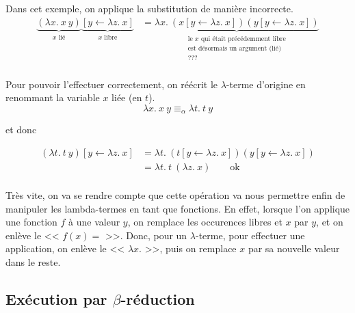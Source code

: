 \documentclass[11pt]{article}
\begin{document}
\begin{example}
    Dans cet exemple, on applique la substitution de manière incorrecte.
    \begin{equation*}
    \begin{aligned}
        \underbrace{\left(\lambda x.~x~y\right)}_{\text{$x$ lié}}\underbrace{\left[y\leftarrow \lambda z.~ x\right]}_{\text{$x$ libre}} &= \underbrace{\lambda x.~\left(x\left[y\leftarrow \lambda z.~ x\right]\right) \left(y\left[y\leftarrow \lambda z.~ x\right]\right)}_{\substack{\text{le $x$ qui était précédemment libre}\\\text{est désormais un argument (lié)}\\\text{???}}}\\
    \end{aligned}
    \end{equation*}

    Pour pouvoir l'effectuer correctement, on réécrit le $\lambda$-terme d'origine en renommant la variable $x$ liée (en $t$).
    $$\lambda x.~ x ~ y\equiv_\alpha\lambda t.~ t ~ y$$

    et donc

    \begin{equation*}
    \begin{aligned}
        \left(\lambda t.~ t ~ y\right)\left[y\leftarrow \lambda z.~ x\right]&=\lambda t. ~\left(t\left[y\leftarrow \lambda z.~ x\right]\right) \left(y\left[y\leftarrow \lambda z.~ x\right]\right)\\
        &=\lambda t. ~t~\left(\lambda z.~ x\right)~~~~~~~~~\text{ok}\\
    \end{aligned}
    \end{equation*}
\end{example}

Très vite, on va se rendre compte que cette opération va nous permettre enfin de manipuler les lambda-termes en tant que fonctions. En effet, lorsque l'on applique une fonction $f$ à une valeur $y$, on remplace les occurences libres et $x$ par $y$, et on enlève le << $f(x) =$ >>. Donc, pour un $\lambda$-terme, pour effectuer une application, on enlève le << $\lambda x.$ >>, puis on remplace $x$ par sa nouvelle valeur dans le reste.

\newpage
\subsection{Exécution par $\beta$-réduction}
\end{document}
